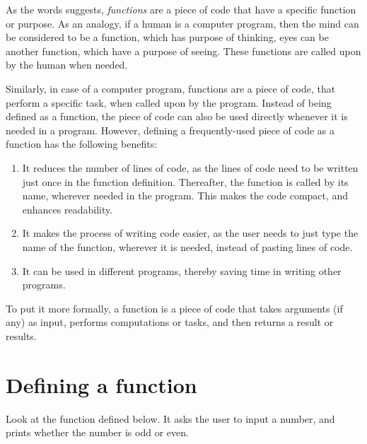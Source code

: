 \documentclass[
  letterpaper,
  DIV=11,
  numbers=noendperiod]{scrreprt}
\begin{document}
As the words suggests, \emph{functions} are a piece of code that have a
specific function or purpose. As an analogy, if a human is a computer
program, then the mind can be considered to be a function, which has
purpose of thinking, eyes can be another function, which have a purpose
of seeing. These functions are called upon by the human when needed.

Similarly, in case of a computer program, functions are a piece of code,
that perform a specific task, when called upon by the program. Instead
of being defined as a function, the piece of code can also be used
directly whenever it is needed in a program. However, defining a
frequently-used piece of code as a function has the following benefits:

\begin{enumerate}
\def\labelenumi{\arabic{enumi}.}
\item
  It reduces the number of lines of code, as the lines of code need to
  be written just once in the function definition. Thereafter, the
  function is called by its name, wherever needed in the program. This
  makes the code compact, and enhances readability.
\item
  It makes the process of writing code easier, as the user needs to just
  type the name of the function, wherever it is needed, instead of
  pasting lines of code.
\item
  It can be used in different programs, thereby saving time in writing
  other programs.
\end{enumerate}

To put it more formally, a function is a piece of code that takes
arguments (if any) as input, performs computations or tasks, and then
returns a result or results.

\hypertarget{defining-a-function}{%
\section{Defining a function}\label{defining-a-function}}

Look at the function defined below. It asks the user to input a number,
and prints whether the number is odd or even.
\end{document}
